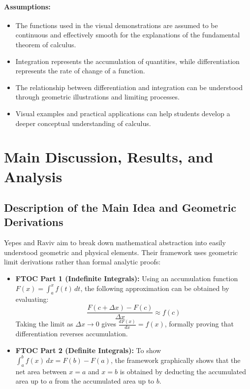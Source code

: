 \documentclass[11pt, a4paper]{article}
\begin{document}
\paragraph{Assumptions:}
\begin{itemize}
    \item The functions used in the visual demonstrations are assumed to be continuous and effectively smooth for the explanations of the fundamental theorem of calculus.
    \item Integration represents the accumulation of quantities, while differentiation represents the rate of change of a function.
    \item The relationship between differentiation and integration can be understood through geometric illustrations and limiting processes.
    \item Visual examples and practical applications can help students develop a deeper conceptual understanding of calculus.
\end{itemize}

\section{Main Discussion, Results, and Analysis}
\label{sec:main_discussion}

\subsection{Description of the Main Idea and Geometric Derivations}
\label{subsec:geometric_derivations}
Yepes and Raviv \cite{Yepes2024} aim to break down mathematical abstraction into easily understood geometric and physical elements. Their framework uses geometric limit derivations rather than formal analytic proofs:
\begin{itemize}
    \item \textbf{FTOC Part 1 (Indefinite Integrals):} Using an accumulation function $F(x) = \int_{a}^{x} f(t) \, dt$, the following approximation can be obtained by evaluating:
    \begin{equation}
    \label{eq:ftoc_part1_approx}
    \frac{F(c + \Delta x) - F(c)}{\Delta x} \approx f(c)
    \end{equation}
    Taking the limit as $\Delta x \to 0$ gives $\frac{dF(x)}{dx} = f(x)$, formally proving that differentiation reverses accumulation.
    
    \item \textbf{FTOC Part 2 (Definite Integrals):} To show $\int_{a}^{b} f(x) \, dx = F(b) - F(a)$, the framework graphically shows that the net area between $x = a$ and $x = b$ is obtained by deducting the accumulated area up to $a$ from the accumulated area up to $b$.
\end{itemize}
\end{document}
